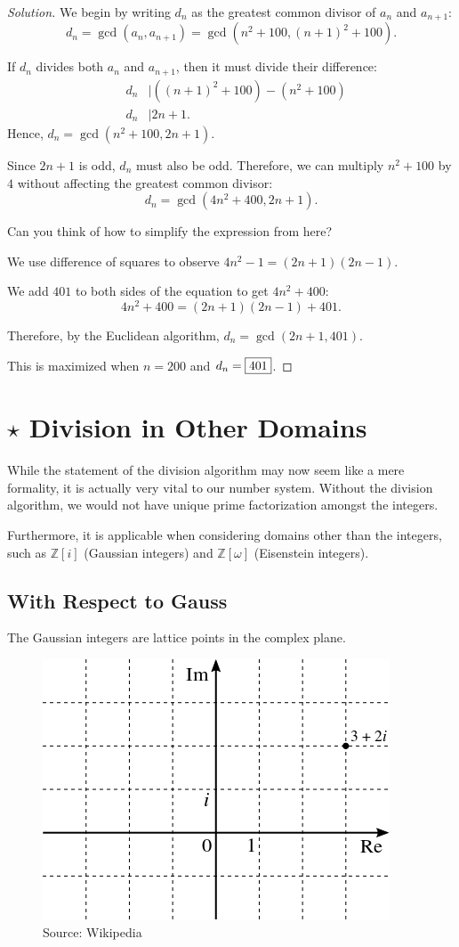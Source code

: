 \begin{proof}[Solution] We begin by writing $d_n$ as the greatest common divisor of $a_n$ and $a_{n+1}$: $$d_n=\gcd(a_n, a_{n+1})=\gcd(n^2+100, (n+1)^2+100).$$  

\clearpage

If $d_n$ divides both $a_n$ and $a_{n+1}$, then it must divide their difference: \begin{eqnarray*} &d_n&\mid \left((n+1)^2+100\right)-\left(n^2+100\right) \\ &d_n&\mid 2n+1. \end{eqnarray*} Hence, $d_n=\gcd(n^2+100, 2n+1)$. 

Since $2n+1$ is odd, $d_n$ must also be odd. Therefore, we can multiply $n^2+100$ by $4$ without affecting the greatest common divisor: $$d_n=\gcd(4n^2+400, 2n+1).$$ 

Can you think of how to simplify the expression from here?

\clearpage

We use difference of squares to observe $4n^2-1=(2n+1)(2n-1)$. 

We add $401$ to both sides of the equation to get $4n^2+400$: $$4n^2+400=(2n+1)(2n-1)+401.$$ 

Therefore, by the Euclidean algorithm, $d_n=\gcd(2n+1, 401)$. 

This is maximized when $n=200$ and $d_n=\framebox{401}$.
\end{proof}
\section{$\star$ Division in Other Domains}

While the statement of the division algorithm may now seem like a mere formality, it is actually very vital to our number system. Without the division algorithm, we would not have unique prime factorization amongst the integers.

Furthermore, it is applicable when considering domains other than the integers, such as $\mathbb{Z}[i]$ (Gaussian integers) and $\mathbb{Z}[\omega]$ (Eisenstein integers).  


\subsection*{With Respect to Gauss}

The Gaussian integers are lattice points in the complex plane. \cite{iurie}

\begin{figure}[H]
	\centering\includegraphics[width=0.21\linewidth]{images/gauss.png}
	\caption{Source:  Wikipedia}
\end{figure}

